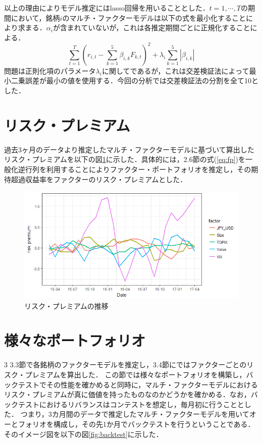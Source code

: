 ﻿\documentclass[11pt]{jreport}
\begin{document}
以上の理由によりモデル推定にはlasso回帰を用いることとした．$t=1,\cdots,T$の期間において，銘柄$i$のマルチ・ファクターモデルは以下の式を最小化することにより求まる．$\alpha_i$が含まれていないが，これは各推定期間ごとに正規化することによる．
\begin{equation}
\sum_{t=1}^T\left(r_{i,t} - \sum_{k=1}^5\beta_{i,k}F_{k,t} \right)^2 + \lambda_i\sum_{k=1}^5|\beta_{i,k}|
\end{equation}
問題は正則化項のパラメータ$\lambda_i$に関してであるが，これは交差検証法によって最小二乗誤差が最小の値を使用する．今回の分析では交差検証法の分割を全て10とした．


\section{リスク・プレミアム}
過去3ヶ月のデータより推定したマルチ・ファクターモデルに基づいて算出したリスク・プレミアムを以下の図\ref{fig:riskpremium}に示した．具体的には，2.6節の式(\ref{eq:fp})を一般化逆行列を利用することによりファクター・ポートフォリオを推定し，その期待超過収益率をファクターのリスク・プレミアムとした．

\begin{figure}[H]
	\begin{center}
		\includegraphics[width=15cm]{./fig/riskpremium.png}
		\caption{リスク・プレミアムの推移}
		\label{fig:riskpremium}
	\end{center}
\end{figure}
\section{様々なポートフォリオ}
3
3.3節で各銘柄のファクターモデルを推定し，3.4節にではファクターごとのリスク・プレミアムを算出した．
この節では様々なポートフォリオを構築し，バックテストでその性能を確かめると同時に，マルチ・ファクターモデルにおけるリスク・プレミアムが真に価値を持ったものなのかどうかを確かめる．なお，バックテストにおけるリバランスはコンテストを想定し，毎月初に行うこととした．
つまり，3カ月間のデータで推定したマルチ・ファクターモデルを用いてオーとフォリオを構成し，その先1か月でバックテストを行うということである．
そのイメージ図を以下の図\ref{fig:backtest}に示した．
\end{document}
